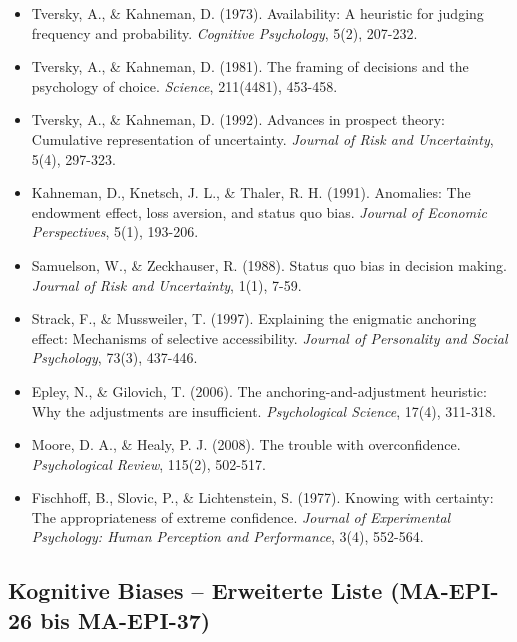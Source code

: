 \begin{itemize}[leftmargin=*]
    \item Tversky, A., \& Kahneman, D. (1973). Availability: A heuristic for judging frequency and probability. \textit{Cognitive Psychology}, 5(2), 207-232.
    \item Tversky, A., \& Kahneman, D. (1981). The framing of decisions and the psychology of choice. \textit{Science}, 211(4481), 453-458.
    \item Tversky, A., \& Kahneman, D. (1992). Advances in prospect theory: Cumulative representation of uncertainty. \textit{Journal of Risk and Uncertainty}, 5(4), 297-323.
    \item Kahneman, D., Knetsch, J. L., \& Thaler, R. H. (1991). Anomalies: The endowment effect, loss aversion, and status quo bias. \textit{Journal of Economic Perspectives}, 5(1), 193-206.
    \item Samuelson, W., \& Zeckhauser, R. (1988). Status quo bias in decision making. \textit{Journal of Risk and Uncertainty}, 1(1), 7-59.
    \item Strack, F., \& Mussweiler, T. (1997). Explaining the enigmatic anchoring effect: Mechanisms of selective accessibility. \textit{Journal of Personality and Social Psychology}, 73(3), 437-446.
    \item Epley, N., \& Gilovich, T. (2006). The anchoring-and-adjustment heuristic: Why the adjustments are insufficient. \textit{Psychological Science}, 17(4), 311-318.
    \item Moore, D. A., \& Healy, P. J. (2008). The trouble with overconfidence. \textit{Psychological Review}, 115(2), 502-517.
    \item Fischhoff, B., Slovic, P., \& Lichtenstein, S. (1977). Knowing with certainty: The appropriateness of extreme confidence. \textit{Journal of Experimental Psychology: Human Perception and Performance}, 3(4), 552-564.
\end{itemize}

\subsection*{Kognitive Biases -- Erweiterte Liste (MA-EPI-26 bis MA-EPI-37)}

